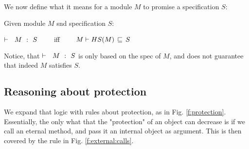 We now define what it means for a module $M$ to promise a specification $S$:

\begin{definition}
Given module $M$ snd specification $S$:

\strut \hspace{2cm} ${\vdash \ \ M\ \ \mathbf{:}\ \ S}$ \ \ \ \  iff \ \ \ \  $M \vdash HS(M)\, \sqsubseteq\, S$
\end{definition}

Notice, that ${\vdash \ \ M\ \ \mathbf{:}\ \ S}$ is only based on the spec of $M$, and does not guarantee that indeed $M$ satisfies $S$.

% 
%
%
%
 


\subsection{Reasoning about protection}
We expand that logic with rules about protection, as in Fig. \ref{f:protection}. Essentially, the only what that the "protection" of an object can decrease is if we call an eternal method, and pass it an internal object as argument. This is then covered by the rule in Fig. \ref{f:external:calls}.

